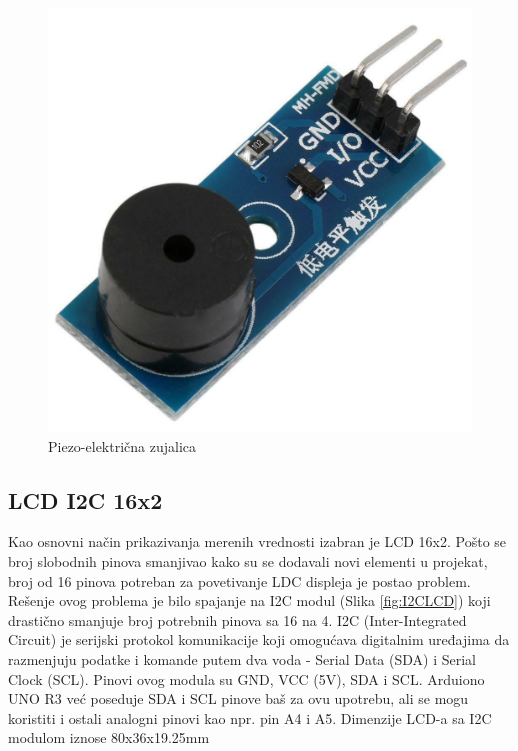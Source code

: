\documentclass[a4paper, 12pt]{article}
\begin{document}
\begin{figure}[H]
\centering
\includegraphics[scale=0.2]{images/buzzer}
\caption{Piezo-električna zujalica} \label{fig:buzzer}
\end{figure}

\vspace{10pt}

\pagebreak

	\subsection{LCD I2C 16x2}
	
	Kao osnovni način prikazivanja merenih vrednosti izabran je LCD 16x2. Pošto se broj slobodnih pinova smanjivao kako su se dodavali novi elementi u projekat, broj od 16 pinova potreban za povetivanje LDC displeja je postao problem. Rešenje ovog problema je bilo spajanje na I2C modul (Slika \ref{fig:I2CLCD}) koji drastično smanjuje broj potrebnih pinova sa 16 na 4. I2C (Inter-Integrated Circuit) je serijski protokol komunikacije koji omogućava digitalnim uređajima da razmenjuju podatke i komande putem dva voda - Serial Data (SDA) i Serial Clock (SCL). Pinovi ovog modula su GND, VCC (5V), SDA i SCL. Arduiono UNO R3 već poseduje SDA i SCL pinove baš za ovu upotrebu, ali se mogu koristiti i ostali analogni pinovi kao npr. pin A4 i A5. Dimenzije LCD-a sa I2C modulom iznose 80x36x19.25mm
	
\end{document}
